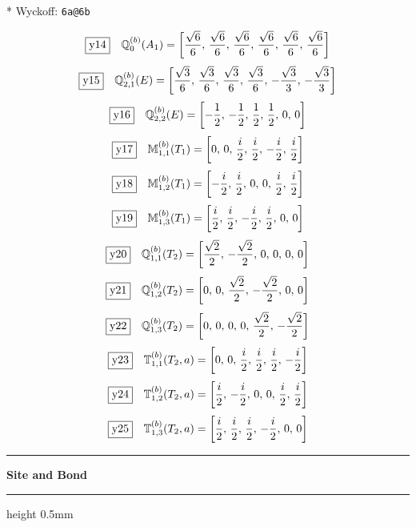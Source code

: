 \documentclass[fleqn,10pt,landscape]{jsarticle}
\begin{document}
\noindent ** Wyckoff: \texttt{6a@6b}

\begin{dmath*}
\fbox{y14}\quad \mathbb{Q}_{0}^{(b)}(A_{1})=\left[ \frac{\sqrt{6}}{6},\, \frac{\sqrt{6}}{6},\, \frac{\sqrt{6}}{6},\, \frac{\sqrt{6}}{6},\, \frac{\sqrt{6}}{6},\, \frac{\sqrt{6}}{6} \right]
\end{dmath*}
\begin{dmath*}
\fbox{y15}\quad \mathbb{Q}_{2,1}^{(b)}(E)=\left[ \frac{\sqrt{3}}{6},\, \frac{\sqrt{3}}{6},\, \frac{\sqrt{3}}{6},\, \frac{\sqrt{3}}{6},\, - \frac{\sqrt{3}}{3},\, - \frac{\sqrt{3}}{3} \right]
\end{dmath*}
\begin{dmath*}
\fbox{y16}\quad \mathbb{Q}_{2,2}^{(b)}(E)=\left[ - \frac{1}{2},\, - \frac{1}{2},\, \frac{1}{2},\, \frac{1}{2},\, 0,\, 0 \right]
\end{dmath*}
\begin{dmath*}
\fbox{y17}\quad \mathbb{M}_{1,1}^{(b)}(T_{1})=\left[ 0,\, 0,\, \frac{i}{2},\, \frac{i}{2},\, - \frac{i}{2},\, \frac{i}{2} \right]
\end{dmath*}
\begin{dmath*}
\fbox{y18}\quad \mathbb{M}_{1,2}^{(b)}(T_{1})=\left[ - \frac{i}{2},\, \frac{i}{2},\, 0,\, 0,\, \frac{i}{2},\, \frac{i}{2} \right]
\end{dmath*}
\begin{dmath*}
\fbox{y19}\quad \mathbb{M}_{1,3}^{(b)}(T_{1})=\left[ \frac{i}{2},\, \frac{i}{2},\, - \frac{i}{2},\, \frac{i}{2},\, 0,\, 0 \right]
\end{dmath*}
\begin{dmath*}
\fbox{y20}\quad \mathbb{Q}_{1,1}^{(b)}(T_{2})=\left[ \frac{\sqrt{2}}{2},\, - \frac{\sqrt{2}}{2},\, 0,\, 0,\, 0,\, 0 \right]
\end{dmath*}
\begin{dmath*}
\fbox{y21}\quad \mathbb{Q}_{1,2}^{(b)}(T_{2})=\left[ 0,\, 0,\, \frac{\sqrt{2}}{2},\, - \frac{\sqrt{2}}{2},\, 0,\, 0 \right]
\end{dmath*}
\begin{dmath*}
\fbox{y22}\quad \mathbb{Q}_{1,3}^{(b)}(T_{2})=\left[ 0,\, 0,\, 0,\, 0,\, \frac{\sqrt{2}}{2},\, - \frac{\sqrt{2}}{2} \right]
\end{dmath*}
\begin{dmath*}
\fbox{y23}\quad \mathbb{T}_{1,1}^{(b)}(T_{2},a)=\left[ 0,\, 0,\, \frac{i}{2},\, \frac{i}{2},\, \frac{i}{2},\, - \frac{i}{2} \right]
\end{dmath*}
\begin{dmath*}
\fbox{y24}\quad \mathbb{T}_{1,2}^{(b)}(T_{2},a)=\left[ \frac{i}{2},\, - \frac{i}{2},\, 0,\, 0,\, \frac{i}{2},\, \frac{i}{2} \right]
\end{dmath*}
\begin{dmath*}
\fbox{y25}\quad \mathbb{T}_{1,3}^{(b)}(T_{2},a)=\left[ \frac{i}{2},\, \frac{i}{2},\, \frac{i}{2},\, - \frac{i}{2},\, 0,\, 0 \right]
\end{dmath*}
\vspace{5mm}
\noindent \rule[0.5mm]{5mm}{0.5mm}\hspace{3mm}\textbf{Site and Bond}\hspace{3mm}\leaders\hrule height 0.5mm\hfill\kern0pt
\vspace{3mm}
\end{document}
